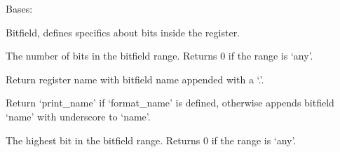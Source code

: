 \documentclass[letterpaper,10pt,english]{sphinxmanual}
\begin{document}
\begin{fulllineitems}
\label{\detokenize{developer:wuppercodegen.classes.BitField}}
Bases: {\hyperref[\detokenize{developer:wuppercodegen.classes.Node}]{}}

Bitfield, defines specifics about bits inside the register.

\begin{fulllineitems}
\label{\detokenize{developer:wuppercodegen.classes.BitField.bits}}
The number of bits in the bitfield range. Returns 0 if the range is `any'.

\end{fulllineitems}


\begin{fulllineitems}
\label{\detokenize{developer:wuppercodegen.classes.BitField.dot_name}}
Return register name with bitfield name appended with a `.'.

\end{fulllineitems}


\begin{fulllineitems}
\label{\detokenize{developer:wuppercodegen.classes.BitField.full_name}}
Return `print\_name' if `format\_name' is defined, otherwise appends bitfield `name' with underscore to `name'.

\end{fulllineitems}


\begin{fulllineitems}
\label{\detokenize{developer:wuppercodegen.classes.BitField.hi}}
The highest bit in the bitfield range. Returns 0 if the range is `any'.

\end{fulllineitems}



\end{fulllineitems}
\end{document}
